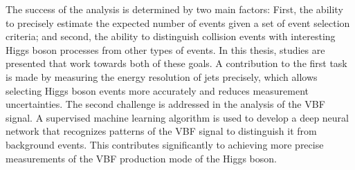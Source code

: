The success of the \HWW analysis is determined by two main factors: 
First, the ability to precisely estimate the expected number of events given a set of event selection criteria; and second, the ability to distinguish collision events with interesting Higgs boson processes from other types of events.
In this thesis, studies are presented that work towards both of these goals.
A contribution to the first task is made by measuring the energy resolution of jets precisely, which allows selecting Higgs boson events more accurately and reduces measurement uncertainties.
The second challenge is addressed in the analysis of the VBF signal.
A supervised machine learning algorithm is used to develop a deep neural network that recognizes patterns of the VBF signal to distinguish it from background events.
This contributes significantly to achieving more precise measurements of the VBF production mode of the Higgs boson.




